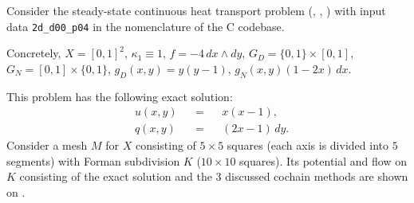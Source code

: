 \begin{example}
  Consider the steady-state continuous heat transport problem
  (,
   ,
   )
  with input data \verb|2d_d00_p04| in the nomenclature of the C codebase.

  Concretely,
    $X = [0, 1]^2$,
    $\kappa_1 \equiv 1$,
    $f = -4 \, d x \wedge d y$,
    $G_D = \{0, 1\} \times [0, 1]$,
    $G_N = [0, 1] \times \{0, 1\}$,
    $g_D(x, y) = y (y - 1)$,
    $g_N(x, y) (1 - 2 x) \, d x$.

  This problem has the following exact solution:
  \begin{subequations}
    \begin{alignat}{3}
      & u(x, y) && = && x (x - 1), \\
      & q(x, y) && = && (2 x - 1)\, d y.
    \end{alignat}
  \end{subequations}
  Consider a mesh $M$ for $X$ consisting of $5 \times 5$ squares (each axis is
  divided into $5$ segments) with Forman subdivision $K$
  ($10 \times 10$ squares).
  Its potential and flow on $K$ consisting of the exact solution and the $3$
  discussed cochain methods are shown on
  .
\end{example}

